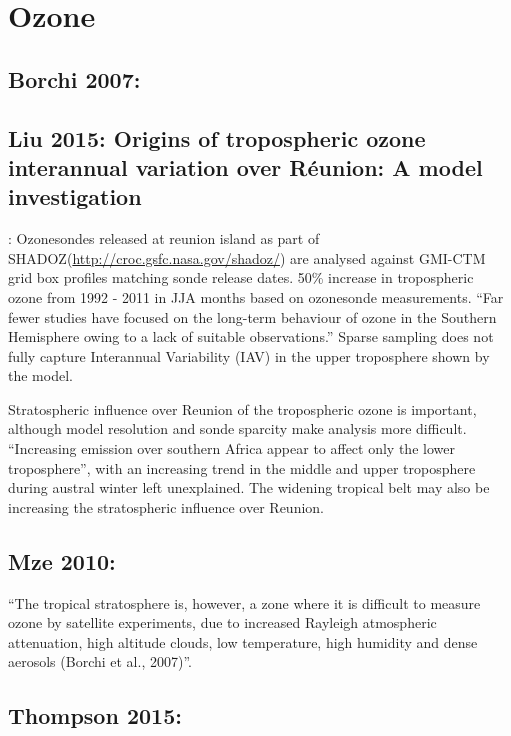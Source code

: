 \documentclass[11pt]{article} %
\begin{document}
\section{Ozone}
  \subsection{Borchi 2007:}


  \subsection{Liu 2015: Origins of tropospheric ozone interannual variation over Réunion: A model investigation}
    \citet{Liu2015}:
    Ozonesondes released at reunion island as part of SHADOZ(\url{http://croc.gsfc.nasa.gov/shadoz/}) are analysed against GMI-CTM grid box profiles matching sonde release dates.
    50\% increase in tropospheric ozone from 1992 - 2011 in JJA months based on ozonesonde measurements.
    ``Far fewer studies have focused on the long-term behaviour of ozone in the Southern Hemisphere owing to a lack of suitable observations.''
    Sparse sampling does not fully capture Interannual Variability (IAV) in the upper troposphere shown by the model.
    
    Stratospheric influence over Reunion of the tropospheric ozone is important, although model resolution and sonde sparcity make analysis more difficult.
    ``Increasing emission over southern Africa appear to affect only the lower troposphere'', with an increasing trend in the middle and upper troposphere during austral winter left unexplained.
    The widening tropical belt may also be increasing the stratospheric influence over Reunion.

  \subsection{Mze 2010:}
    \citet{Mze2010}
    ``The tropical stratosphere is, however, a zone where it is difficult to measure ozone by satellite experiments, due to increased Rayleigh atmospheric attenuation, high altitude clouds, low temperature, high humidity and dense aerosols (Borchi et al., 2007)''.

  \subsection{Thompson 2015: }
  
\printbibliography[heading=bibintoc]
\end{document}
